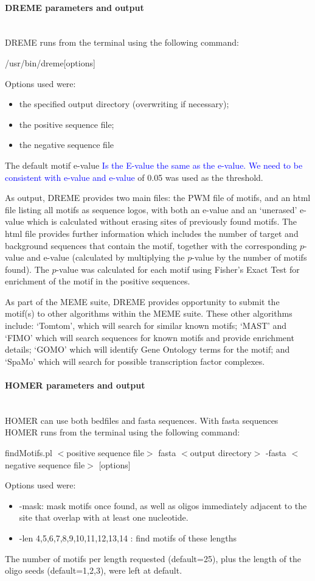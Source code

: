 \documentclass[12pt]{article}
\begin{document}
\paragraph{DREME parameters and output}\mbox{}\\
DREME runs from the terminal using the following command:
\begin{center}
/usr/bin/dreme[options]
\end{center}
Options used were:
\begin{itemize}
\item the specified output directory (overwriting if necessary);
\item the positive sequence file; 
\item the negative sequence file
\end{itemize}
The default motif e-value \textcolor{blue}{Is the E-value the same as the e-value. We need to be consistent with e-value and e-value} of 0.05 was used as the threshold.

As output, DREME provides two main files: the PWM file of motifs, and an html file listing all motifs as sequence logos, with both an e-value and an `unerased' e-value which is calculated without erasing sites of previously found motifs. The html file provides further information which includes the number of target and background sequences that contain the motif, together with the corresponding $p$-value and e-value (calculated by multiplying the $p$-value by the number of motifs found). The $p$-value was calculated for each motif using Fisher's Exact Test for enrichment of the motif in the positive sequences.

As part of the MEME suite, DREME provides opportunity to submit the motif(s) to other algorithms within the MEME suite. These other algorithms include: `Tomtom', which will search for similar known motifs; `MAST' and `FIMO' which will search sequences for known motifs and provide enrichment details; `GOMO' which will identify Gene Ontology terms for the motif; and `SpaMo' which will search for possible transcription factor complexes.


\paragraph{HOMER parameters and output}\mbox{}\\
HOMER can use both bedfiles and fasta sequences. With fasta sequences HOMER runs from the terminal using the following command:
\begin{center}
findMotifs.pl $<$positive sequence file$>$ fasta $<$output directory$>$ -fasta $<$negative sequence file$>$ [options]
\end{center}
Options used were:
\begin{itemize}
\item -mask: mask motifs once found, as well as oligos immediately adjacent to the site that overlap with at least one nucleotide.
\item -len 4,5,6,7,8,9,10,11,12,13,14 : find motifs of these lengths
\end{itemize}
The number of motifs per length requested (default=25), plus the length of the oligo seeds (default=1,2,3), were left at default.
\end{document}
